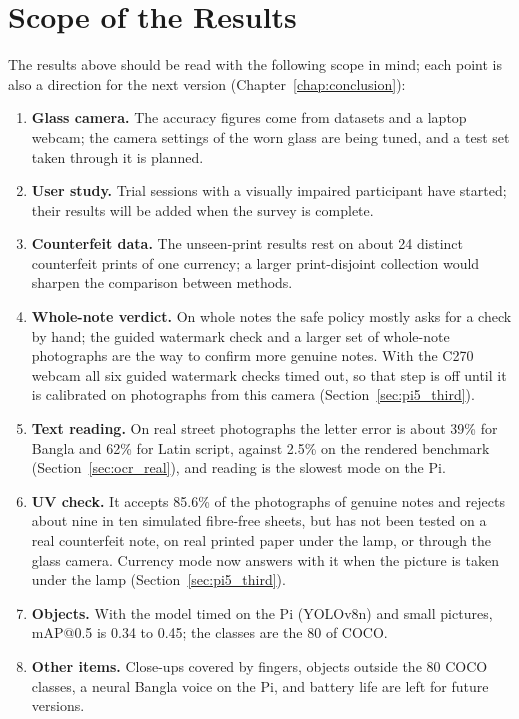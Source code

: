 \section{Scope of the Results}
The results above should be read with the following scope in mind; each point is also a direction for the next version (Chapter~\ref{chap:conclusion}):
\begin{enumerate}[noitemsep]
    \item \textbf{Glass camera.} The accuracy figures come from datasets and a laptop webcam; the camera settings of the worn glass are being tuned, and a test set taken through it is planned.
    \item \textbf{User study.} Trial sessions with a visually impaired participant have started; their results will be added when the survey is complete.
    \item \textbf{Counterfeit data.} The unseen-print results rest on about 24 distinct counterfeit prints of one currency; a larger print-disjoint collection would sharpen the comparison between methods.
    \item \textbf{Whole-note verdict.} On whole notes the safe policy mostly asks for a check by hand; the guided watermark check and a larger set of whole-note photographs are the way to confirm more genuine notes. With the C270 webcam all six guided watermark checks timed out, so that step is off until it is calibrated on photographs from this camera (Section~\ref{sec:pi5_third}).
    \item \textbf{Text reading.} On real street photographs the letter error is about 39\% for Bangla and 62\% for Latin script, against 2.5\% on the rendered benchmark (Section~\ref{sec:ocr_real}), and reading is the slowest mode on the Pi.
    \item \textbf{UV check.} It accepts 85.6\% of the photographs of genuine notes and rejects about nine in ten simulated fibre-free sheets, but has not been tested on a real counterfeit note, on real printed paper under the lamp, or through the glass camera. Currency mode now answers with it when the picture is taken under the lamp (Section~\ref{sec:pi5_third}).
    \item \textbf{Objects.} With the model timed on the Pi (YOLOv8n) and small pictures, mAP@0.5 is 0.34 to 0.45; the classes are the 80 of COCO.
    \item \textbf{Other items.} Close-ups covered by fingers, objects outside the 80 COCO classes, a neural Bangla voice on the Pi, and battery life are left for future versions.
\end{enumerate}

